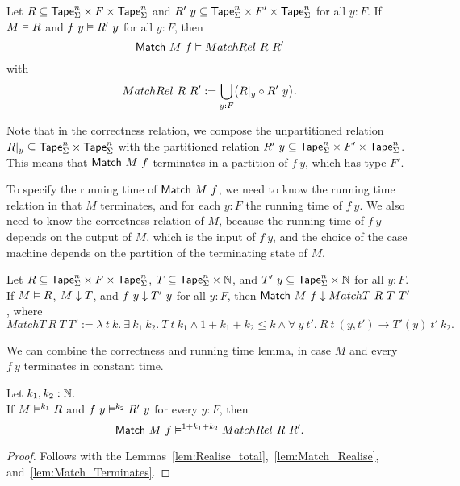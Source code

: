 \begin{lemma}
  \label{lem:Match_Realise}
  Let $R \subseteq \mathsf{Tape}_\Sigma^n \times F \times \mathsf{Tape}_\Sigma^n$ and $R'~y \subseteq \mathsf{Tape}_\Sigma^n \times F' \times \mathsf{Tape}_\Sigma^n$ for all $y:F$.
  If $M \mathrel{\vDash} R$ and $f~y \mathrel{\vDash} R'~y$ for all $y:F$, then
  \[
    \mathsf{Match}~M~f \mathrel{\vDash} MatchRel~R~R'
  \]
  with
  \[
    MatchRel~R~R' := \bigcup_{y:F} \bigl( R{|}_{y} \circ R'~y \bigr).
  \]
\end{lemma}

Note that in the correctness relation, we compose the unpartitioned relation $R {|}_{y} \subseteq \mathsf{Tape}_\Sigma^n \times \mathsf{Tape}_\Sigma^n$ with the
partitioned relation $R'~y \subseteq \mathsf{Tape}_\Sigma^n \times F' \times \mathsf{Tape}_\Sigma^n$.  This means that $\mathsf{Match}~M~f$ terminates in a partition of
$f~y$, which has type $F'$.

To specify the running time of $\mathsf{Match}~M~f$, we need to know the running time relation in that $M$ terminates, and for each $y:F$ the running time of $f~y$.  We
also need to know the correctness relation of $M$, because the running time of $f~y$ depends on the output of $M$, which is the input of $f~y$, and the
choice of the case machine depends on the partition of the terminating state of $M$.

\begin{lemma}
  \label{lem:Match_Terminates}
  Let $R \subseteq \mathsf{Tape}_\Sigma^n \times F \times \mathsf{Tape}_\Sigma^n$, $T \subseteq \mathsf{Tape}_\Sigma^n \times \mathbb{N}$, and
  $T'~y \subseteq \mathsf{Tape}_\Sigma^n \times \mathbb{N}$ for all $y:F$.  If $M \mathrel{\vDash} R$, $M \mathrel{\downarrow} T$, and $f~y \mathrel{\downarrow} T'~y$ for all $y:F$, then
  $\mathsf{Match}~M~f \mathrel{\downarrow} MatchT~R~T~T'$, where
  \[
    MatchT~R~T~T' :=
    \lambda~t~k.~ \exists~k_1~k_2.~T~t~k_1 \land 1+k_1+k_2 \le k \land
      \forall~y~t'.~ R~t~(y,t') \rightarrow T'(y)~t'~k_2.
  \]
\end{lemma}

We can combine the correctness and running time lemma, in case $M$ and every $f~y$ terminates in constant time.
\begin{lemma}
  \label{lem:Match_RealiseIn}
  Let $k_1, k_2:\mathbb{N}$.\\
  If $M \mathrel{\vDash^{k_1}} R$ and $f~y \mathrel{\vDash^{k_2}} R'~y$ for every $y:F$, then
  \[ \mathsf{Match}~M~f \mathrel{\vDash^{1+k_1+k_2}} MatchRel~R~R'. \]
\end{lemma}
\begin{proof}
  Follows with the Lemmas~\ref{lem:Realise_total},~\ref{lem:Match_Realise}, and~\ref{lem:Match_Terminates}.
\end{proof}


